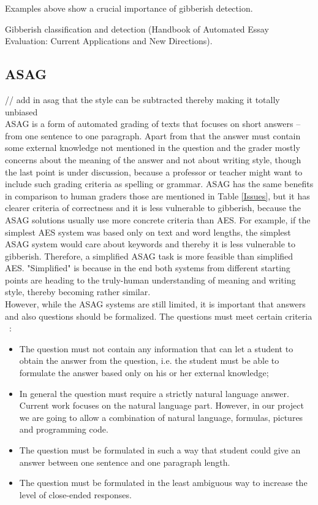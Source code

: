 \documentclass[11pt]{report}
\numberwithin{equation}{section} %
\begin{document}
Examples above show a crucial importance of gibberish detection.

Gibberish classification and detection (Handbook of Automated Essay Evaluation: Current Applications and New Directions).


\subsection{ASAG}

// add in asag that the style can be subtracted thereby making it totally unbiased\\


ASAG is a form of automated grading of texts that focuses on short answers -- from one sentence to one paragraph. Apart from that the answer must contain some external knowledge not mentioned in the question and the grader mostly concerns about the meaning of the answer and not about writing style, though the last point is under discussion, because a professor or teacher might want to include such grading criteria as spelling or grammar. ASAG has the same benefits in comparison to human graders those are mentioned in Table \ref{Issues}, but it has clearer criteria of correctness and it is less vulnerable to gibberish, because the ASAG solutions usually use more concrete criteria than AES. For example, if the simplest AES system was based only on text and word lengths, the simplest ASAG system would care about keywords and thereby it is less vulnerable to gibberish. Therefore, a simplified ASAG task is more feasible than simplified AES. "Simplified" is because in the end both systems from different starting points are heading  to the truly-human understanding of meaning and writing style, thereby becoming rather similar.\\

However, while the ASAG systems are still limited, it is important that answers and also questions should be formalized. The questions must meet certain criteria ~\cite{Hasanah}:
\begin{itemize}
\item The question must not contain any information that can let a student to obtain the answer from the question, i.e. the student must be able to formulate the answer based only on his or her external knowledge;
\item In general the question must require a strictly natural language answer. Current work focuses on the natural language part. However, in our project we are going to allow a combination of natural language, formulas, pictures and programming code.
\item The question must be formulated in such a way that student could give an answer between one sentence and one paragraph length.
\item The question must be formulated in the least ambiguous way to increase the level of close-ended responses.
\end{itemize}
\end{document}
